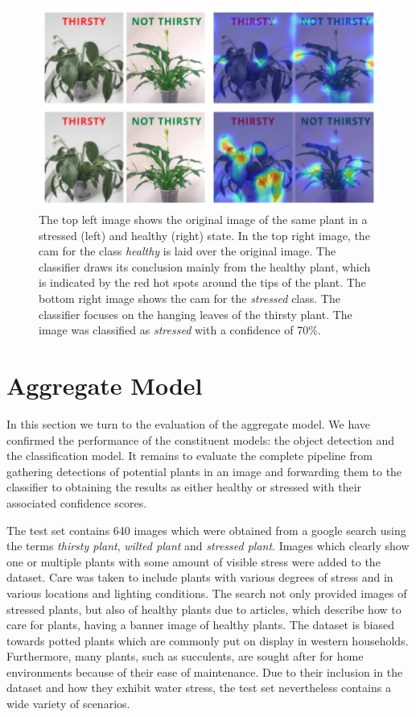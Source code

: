 \documentclass[draft,final]{vutinfth} %
\begin{document}
\begin{figure}
  \centering
  \includegraphics{graphics/classifier-cam.pdf}
  \caption[Classifier \glspl{cam}.]{The top left image shows the
    original image of the same plant in a stressed (left) and healthy
    (right) state. In the top right image, the \gls{cam} for the class
    \emph{healthy} is laid over the original image. The classifier
    draws its conclusion mainly from the healthy plant, which is
    indicated by the red hot spots around the tips of the plant. The
    bottom right image shows the \gls{cam} for the \emph{stressed}
    class. The classifier focuses on the hanging leaves of the thirsty
    plant. The image was classified as \emph{stressed} with a
    confidence of 70\%.}
  \label{fig:classifier-cam}
\end{figure}


\section{Aggregate Model}
\label{sec:aggregate-model}

In this section we turn to the evaluation of the aggregate model. We
have confirmed the performance of the constituent models: the object
detection and the classification model. It remains to evaluate the
complete pipeline from gathering detections of potential plants in an
image and forwarding them to the classifier to obtaining the results
as either healthy or stressed with their associated confidence scores.

The test set contains 640 images which were obtained from a google
search using the terms \emph{thirsty plant}, \emph{wilted plant} and
\emph{stressed plant}. Images which clearly show one or multiple
plants with some amount of visible stress were added to the
dataset. Care was taken to include plants with various degrees of
stress and in various locations and lighting conditions. The search
not only provided images of stressed plants, but also of healthy
plants due to articles, which describe how to care for plants, having
a banner image of healthy plants. The dataset is biased towards potted
plants which are commonly put on display in western
households. Furthermore, many plants, such as succulents, are sought
after for home environments because of their ease of maintenance. Due
to their inclusion in the dataset and how they exhibit water stress,
the test set nevertheless contains a wide variety of scenarios.
\end{document}
